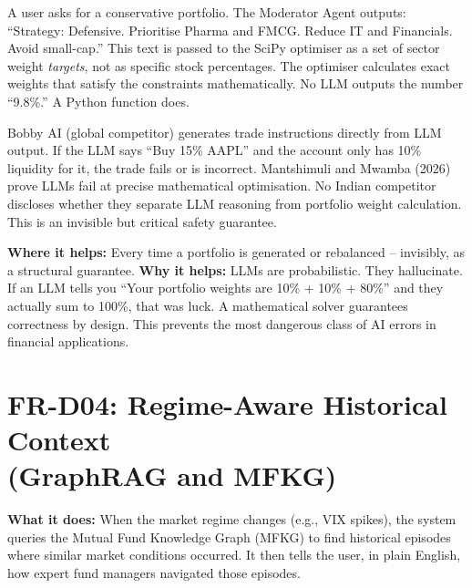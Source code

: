 \documentclass[12pt, a4paper, openany, oneside]{report}
\begin{document}
\begin{examplebox}
A user asks for a conservative portfolio. The Moderator Agent outputs: ``Strategy: Defensive. Prioritise Pharma and FMCG. Reduce IT and Financials. Avoid small-cap.'' This text is passed to the SciPy optimiser as a set of sector weight \textit{targets}, not as specific stock percentages. The optimiser calculates exact weights that satisfy the constraints mathematically. No LLM outputs the number ``9.8\%.'' A Python function does.
\end{examplebox}

\begin{gapbox}
Bobby AI (global competitor) generates trade instructions directly from LLM output. If the LLM says ``Buy 15\% AAPL'' and the account only has 10\% liquidity for it, the trade fails or is incorrect. Mantshimuli and Mwamba (2026) prove LLMs fail at precise mathematical optimisation. No Indian competitor discloses whether they separate LLM reasoning from portfolio weight calculation. This is an invisible but critical safety guarantee.
\end{gapbox}

\begin{valuebox}
\textbf{Where it helps:} Every time a portfolio is generated or rebalanced -- invisibly, as a structural guarantee. \textbf{Why it helps:} LLMs are probabilistic. They hallucinate. If an LLM tells you ``Your portfolio weights are 10\% + 10\% + 80\%'' and they actually sum to 100\%, that was luck. A mathematical solver guarantees correctness by design. This prevents the most dangerous class of AI errors in financial applications.
\end{valuebox}

\section[FR-D04: Regime-Aware Historical Context]{FR-D04: Regime-Aware Historical Context\\[0.2em] (GraphRAG and MFKG)}

\textbf{What it does:} When the market regime changes (e.g., VIX spikes), the system queries the Mutual Fund Knowledge Graph (MFKG) to find historical episodes where similar market conditions occurred. It then tells the user, in plain English, how expert fund managers navigated those episodes.
\end{document}
